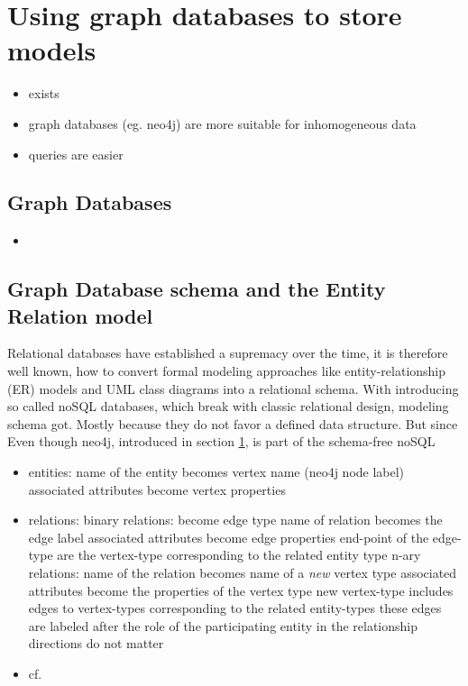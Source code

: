 \section{Using graph databases to store \sysbio models}
	\label{sec:graph-db}
	\begin{itemize}
		\item \masymos exists
		\item graph databases (eg. neo4j) are more suitable for inhomogeneous data
		\item queries are easier
	\end{itemize}
	
	\subsection{Graph Databases}
	\begin{itemize}
		\item {}
	\end{itemize}
	
	\subsection{Graph Database schema and the Entity Relation model}
	\label{sec:graph-db:er}
	Relational databases have established a supremacy over the time, it is therefore well known, how to convert formal modeling approaches like entity-relationship (ER) models and UML class diagrams into a relational schema. With introducing so called noSQL databases, which break with classic relational design, modeling schema got. Mostly because they do not favor a defined data structure.
	But since 
	Even though neo4j, introduced in section \ref{sec:graph-db}, is part of the schema-free noSQL 
	\begin{itemize}
	\item entities:
		\subitem name of the entity becomes vertex name (neo4j node label)
		\subitem associated attributes become vertex properties
	\item relations:
		\subitem binary relations:
			\subsubitem become edge type
			\subsubitem name of relation becomes the edge label
			\subsubitem associated attributes become edge properties
			\subsubitem end-point of the edge-type are the vertex-type corresponding to the related entity type
		\subitem n-ary relations:
			\subsubitem name of the relation becomes name of a \emph{new} vertex type
			\subsubitem associated attributes become the properties of the vertex type
			\subsubitem new vertex-type includes edges to vertex-types corresponding to the related entity-types
			\subsubitem these edges are labeled after the role of the participating entity in the relationship
			\subsubitem directions do not matter
	\item cf. \cite{Siriwaradhana2014}
	\end{itemize}
	
